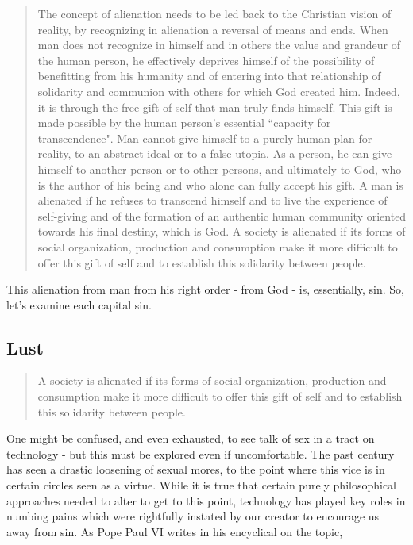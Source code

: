 \documentclass[letterpaper]{article}
\begin{document}
\begin{quote}
  The concept of alienation needs to be led back to the Christian vision of reality, by recognizing in alienation a reversal of means and ends. When man does not recognize in himself and in others the value and grandeur of the human person, he effectively deprives himself of the possibility of benefitting from his humanity and of entering into that relationship of solidarity and communion with others for which God created him. Indeed, it is through the free gift of self that man truly finds himself. This gift is made possible by the human person's essential ``capacity for transcendence". Man cannot give himself to a purely human plan for reality, to an abstract ideal or to a false utopia. As a person, he can give himself to another person or to other persons, and ultimately to God, who is the author of his being and who alone can fully accept his gift. A man is alienated if he refuses to transcend himself and to live the experience of self-giving and of the formation of an authentic human community oriented towards his final destiny, which is God. A society is alienated if its forms of social organization, production and consumption make it more difficult to offer this gift of self and to establish this solidarity between people.
\end{quote}

This alienation from man from his right order - from God - is, essentially, sin. So, let's examine each capital sin.

\subsection{Lust}

\begin{quote}
  A society is alienated if its forms of social organization, production and consumption make it more difficult to offer this gift of self and to establish this solidarity between people.
\end{quote}

One might be confused, and even exhausted, to see talk of sex in a tract on technology - but this must be explored even if uncomfortable. The past century has seen a drastic loosening of sexual mores, to the point where this vice is in certain circles seen as a virtue. While it is true that certain purely philosophical approaches needed to alter to get to this point, technology has played key roles in numbing pains which were rightfully instated by our creator to encourage us away from sin. As Pope Paul VI writes in his encyclical on the topic,
\end{document}
